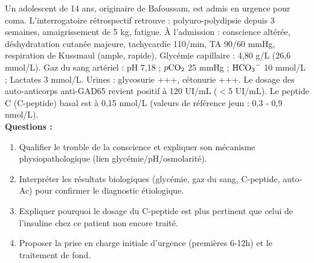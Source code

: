 \documentclass[11pt]{article}
\begin{document}
\begin{exercice}
Un adolescent de 14 ans, originaire de Bafoussam, est admis en urgence pour coma. L'interrogatoire rétrospectif retrouve : polyuro-polydipsie depuis 3 semaines, amaigrissement de 5 kg, fatigue. À l'admission : conscience altérée, déshydratation cutanée majeure, tachycardie 110/min, TA 90/60 mmHg, respiration de Kussmaul (ample, rapide). Glycémie capillaire : 4,80 g/L (26,6 mmol/L). Gaz du sang artériel : pH 7,18 ; $p\ce{CO2}$ 25 mmHg ; $\ce{HCO3-}$ 10 mmol/L ; Lactates 3 mmol/L. Urines : glycosurie +++, cétonurie +++. Le dosage des auto-anticorps anti-GAD65 revient positif à 120 UI/mL ($< 5$ UI/mL). Le peptide C (C-peptide) basal est à 0,15 nmol/L (valeurs de référence jeun : 0,3 - 0,9 nmol/L).
\\
\textbf{Questions :}
\begin{enumerate}
    \item Qualifier le trouble de la conscience et expliquer son mécanisme physiopathologique (lien glycémie/pH/osmolarité).
    \item Interpréter les résultats biologiques (glycémie, gaz du sang, C-peptide, auto-Ac) pour confirmer le diagnostic étiologique.
    \item Expliquer pourquoi le dosage du C-peptide est plus pertinent que celui de l'insuline chez ce patient non encore traité.
    \item Proposer la prise en charge initiale d'urgence (premières 6-12h) et le traitement de fond.
\end{enumerate}
\end{exercice}
\end{document}
